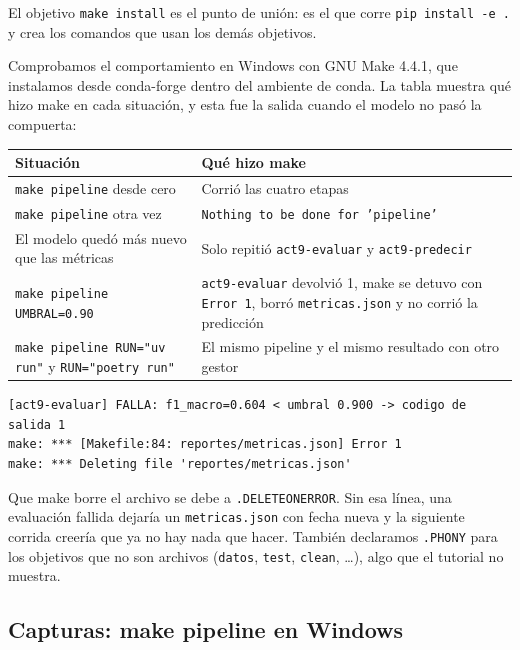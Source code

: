 \documentclass[12pt,a4paper]{article}
\renewcommand{\_}{\guionbajo\allowbreak}
\begin{document}
El objetivo \texttt{make install} es el punto de unión: es el que corre \texttt{pip install -e .}
y crea los comandos que usan los demás objetivos.

Comprobamos el comportamiento en Windows con GNU Make 4.4.1, que instalamos desde conda-forge
dentro del ambiente de conda. La tabla muestra qué hizo make en cada situación, y esta fue la salida
cuando el modelo no pasó la compuerta:

\begin{table}[htbp]
\centering
\small
\renewcommand{\arraystretch}{1.25}
\begin{tabular}{|>{\raggedright\arraybackslash}p{5.4cm}|>{\raggedright\arraybackslash}p{8.2cm}|}
\hline
\textbf{Situación} & \textbf{Qué hizo make} \\
\hline
\texttt{make pipeline} desde cero & Corrió las cuatro etapas \\
\hline
\texttt{make pipeline} otra vez & \texttt{Nothing to be done for 'pipeline'} \\
\hline
El modelo quedó más nuevo que las métricas & Solo repitió \texttt{act9-evaluar} y
\texttt{act9-predecir} \\
\hline
\texttt{make pipeline UMBRAL=0.90} & \texttt{act9-evaluar} devolvió 1, make se detuvo con
\texttt{Error 1}, borró \texttt{metricas.json} y no corrió la predicción \\
\hline
\texttt{make pipeline RUN="uv run"} y \texttt{RUN="poetry run"} & El mismo pipeline y el mismo
resultado con otro gestor \\
\hline
\end{tabular}
\end{table}

\begin{verbatim}
[act9-evaluar] FALLA: f1_macro=0.604 < umbral 0.900 -> codigo de salida 1
make: *** [Makefile:84: reportes/metricas.json] Error 1
make: *** Deleting file 'reportes/metricas.json'
\end{verbatim}

Que make borre el archivo se debe a \texttt{.DELETE\_ON\_ERROR}. Sin esa línea, una evaluación
fallida dejaría un \texttt{metricas.json} con fecha nueva y la siguiente corrida creería que ya no
hay nada que hacer. También declaramos \texttt{.PHONY} para los objetivos que no son archivos
(\texttt{datos}, \texttt{test}, \texttt{clean}, \ldots), algo que el tutorial no muestra.

\subsection{Capturas: make pipeline en Windows}
\end{document}
